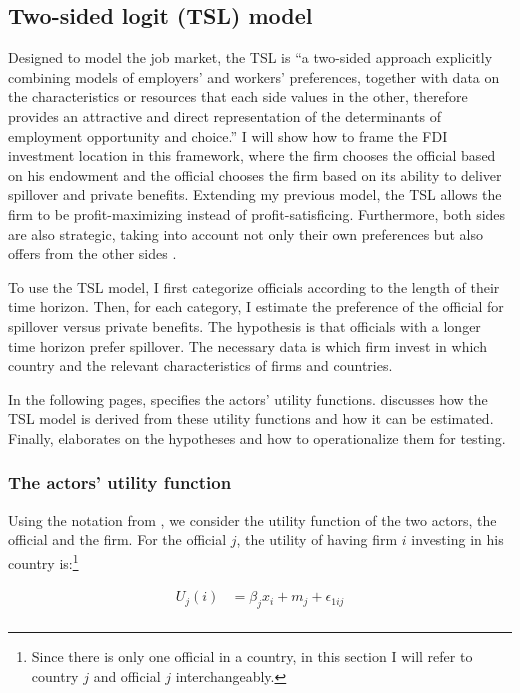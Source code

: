 \subsection{Two-sided logit (TSL) model}

Designed to model the job market, the TSL is ``a two-sided approach explicitly combining models of employers' and workers' preferences, together with data on the characteristics or resources that each side values in the other, therefore provides an attractive and direct representation of the determinants of employment opportunity and choice.'' I will show how to frame the FDI investment location in this framework, where the firm chooses the official based on his endowment and the official chooses the firm based on its ability to deliver spillover and private benefits. Extending my previous model, the TSL allows the firm to be profit-maximizing instead of profit-satisficing. Furthermore, both sides are also strategic, taking into account not only their own preferences but also offers from the other sides \citep{Logan1996a}.

To use the TSL model, I first categorize officials according to the length of their time horizon. Then, for each category, I estimate the preference of the official for spillover versus private benefits. The hypothesis is that officials with a longer time horizon prefer spillover. The necessary data is which firm invest in which country and the relevant characteristics of firms and countries.

In the following pages,  specifies the actors' utility functions.  discusses how the TSL model is derived from these utility functions and how it can be estimated. Finally,  elaborates on the hypotheses and how to operationalize them for testing.

\subsubsection{The actors' utility function}
\label{sec:tsl_actor_utility}


Using the notation from \citet{Logan1998}, we consider the utility function of the two actors, the official and the firm. For the official $j$, the utility of having firm $i$ investing in his country is:\footnote{Since there is only one official in a country, in this section I will refer to country $j$ and official $j$ interchangeably.}

\begin{align}
U_j(i) &= \beta_j x_i + m_j + \epsilon_{1ij} \\
\end{align}

